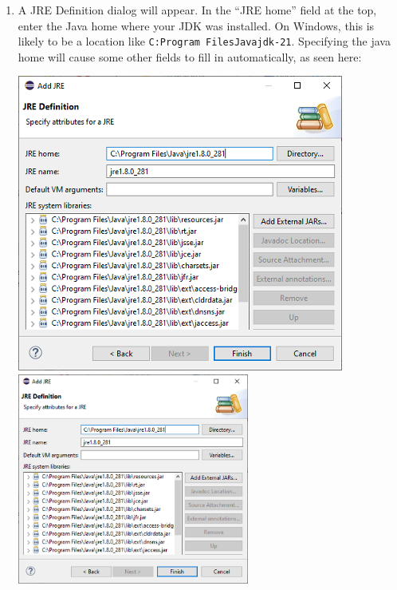 \begin{enumerate}
\item A {\sf JRE Definition} dialog will appear. In the ``{\sf JRE home}''
field at the top, enter the Java home \directory{} where your JDK was
installed.
\ifWindows %
On Windows, this is likely to be a location like {\tt C:\BKS Program
Files\BKS Java\BKS jdk-21}. Specifying the java
home \directory{} will cause some other fields to fill in
automatically, as seen here:
\begin{center}
\iflatexml
   \includegraphics[]{images/EclipseJREDefinition}
\else
   \includegraphics[width=0.6\textwidth]{images/EclipseJREDefinition}
\fi
\end{center}
\fi %


\end{enumerate}
